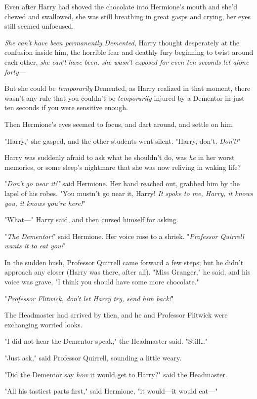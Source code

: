 Even after Harry had shoved the chocolate into Hermione's mouth and she'd 
chewed and swallowed, she was still breathing in great gasps and crying, her 
eyes still seemed unfocused.

\emph{She can't have been permanently Demented,} Harry thought desperately at 
the confusion inside him, the horrible fear and deathly fury beginning to twist 
around each other, \emph{she can't have been, she wasn't exposed for even ten 
seconds let alone forty---}

But she could be \emph{temporarily} Demented, as Harry realized in that moment, 
there wasn't any rule that you couldn't be \emph{temporarily} injured by a 
Dementor in just ten seconds if you were sensitive enough.

Then Hermione's eyes seemed to focus, and dart around, and settle on him.

"Harry," she gasped, and the other students went silent. "Harry, don't. 
\emph{Don't!}"

Harry was suddenly afraid to ask what he shouldn't do, was \emph{he} in her 
worst memories, or some sleep's nightmare that she was now reliving in waking 
life?

"\emph{Don't go near it!"} said Hermione. Her hand reached out, grabbed him by 
the lapel of his robes. "You mustn't go near it, Harry! \emph{It spoke to me, 
Harry, it knows you, it knows you're here!}"

"What---" Harry said, and then cursed himself for asking.

"\emph{The Dementor!}" said Hermione. Her voice rose to a shriek. 
"\emph{Professor Quirrell wants it to eat you!}"

In the sudden hush, Professor Quirrell came forward a few steps; but he didn't 
approach any closer (Harry was there, after all). "Miss Granger," he said, and 
his voice was grave, "I think you should have some more chocolate."

"\emph{Professor Flitwick, don't let Harry try, send him back!}"

The Headmaster had arrived by then, and he and Professor Flitwick were 
exchanging worried looks.

"I did not hear the Dementor speak," the Headmaster said. "Still{\ldots}"

"Just ask," said Professor Quirrell, sounding a little weary.

"Did the Dementor say \emph{how} it would get to Harry?" said the Headmaster.

"All his tastiest parts first," said Hermione, "it would---it would eat---"

